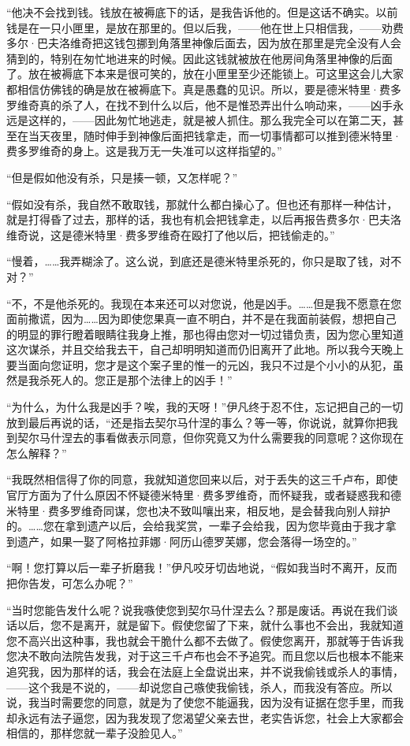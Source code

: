 \par “他决不会找到钱。钱放在被褥底下的话，是我告诉他的。但是这话不确实。以前钱是在一只小匣里，是放在那里的。但以后我，——他在世上只相信我，——劝费多尔·巴夫洛维奇把这钱包挪到角落里神像后面去，因为放在那里是完全没有人会猜到的，特别在匆忙地进来的时候。因此这钱就被放在他房间角落里神像的后面了。放在被褥底下本来是很可笑的，放在小匣里至少还能锁上。可这里这会儿大家都相信仿佛钱的确是放在被褥底下。真是愚蠢的见识。所以，要是德米特里·费多罗维奇真的杀了人，在找不到什么以后，他不是惟恐弄出什么响动来，——凶手永远是这样的，——因此匆忙地逃走，就是被人抓住。那么我完全可以在第二天，甚至在当天夜里，随时伸手到神像后面把钱拿走，而一切事情都可以推到德米特里·费多罗维奇的身上。这是我万无一失准可以这样指望的。”
\par “但是假如他没有杀，只是揍一顿，又怎样呢？”
\par “假如没有杀，我自然不敢取钱，那就什么都白操心了。但也还有那样一种估计，就是打得昏了过去，那样的话，我也有机会把钱拿走，以后再报告费多尔·巴夫洛维奇说，这是德米特里·费多罗维奇在殴打了他以后，把钱偷走的。”
\par “慢着，……我弄糊涂了。这么说，到底还是德米特里杀死的，你只是取了钱，对不对？”
\par “不，不是他杀死的。我现在本来还可以对您说，他是凶手。……但是我不愿意在您面前撒谎，因为……因为即使您果真一直不明白，并不是在我面前装假，想把自己的明显的罪行瞪着眼睛往我身上推，那也得由您对一切过错负责，因为您心里知道这次谋杀，并且交给我去干，自己却明明知道而仍旧离开了此地。所以我今天晚上要当面向您证明，您才是这个案子里的惟一的元凶，我只不过是个小小的从犯，虽然是我杀死人的。您正是那个法律上的凶手！”
\par “为什么，为什么我是凶手？唉，我的天呀！”伊凡终于忍不住，忘记把自己的一切放到最后再说的话，“还是指去契尔马什涅的事么？等一等，你说说，就算你把我到契尔马什涅去的事看做表示同意，但你究竟又为什么需要我的同意呢？这你现在怎么解释？”
\par “我既然相信得了你的同意，我就知道您回来以后，对于丢失的这三千卢布，即使官厅方面为了什么原因不怀疑德米特里·费多罗维奇，而怀疑我，或者疑惑我和德米特里·费多罗维奇同谋，您也决不致叫嚷出来，相反地，是会替我向别人辩护的。……您在拿到遗产以后，会给我奖赏，一辈子会给我，因为您毕竟由于我才拿到遗产，如果一娶了阿格拉菲娜·阿历山德罗芙娜，您会落得一场空的。”
\par “啊！您打算以后一辈子折磨我！”伊凡咬牙切齿地说，“假如我当时不离开，反而把你告发，可怎么办呢？”
\par “当时您能告发什么呢？说我嗾使您到契尔马什涅去么？那是废话。再说在我们谈话以后，您不是离开，就是留下。假使您留了下来，就什么事也不会出，我就知道您不高兴出这种事，我也就会干脆什么都不去做了。假使您离开，那就等于告诉我您决不敢向法院告发我，对于这三千卢布也会不予追究。而且您以后也根本不能来追究我，因为那样的话，我会在法庭上全盘说出来，并不说我偷钱或杀人的事情，——这个我是不说的，——却说您自己嗾使我偷钱，杀人，而我没有答应。所以说，我当时需要您的同意，就是为了使您不能逼我，因为没有证据在您手里，而我却永远有法子逼您，因为我发现了您渴望父亲去世，老实告诉您，社会上大家都会相信的，那样您就一辈子没脸见人。”
